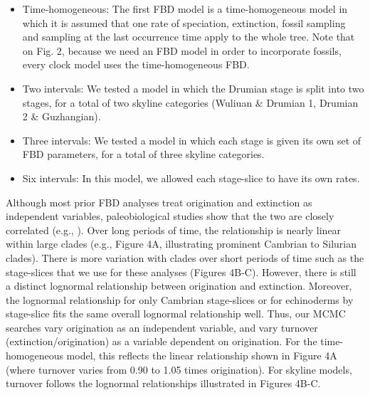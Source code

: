 \documentclass{article}
\begin{document}
\begin{itemize}
\item Time-homogeneous: The first FBD model is a time-homogeneous model in which it is assumed that one rate of speciation, extinction, fossil sampling and sampling at the last occurrence time apply to the whole tree. Note that on Fig. 2, because we need an FBD model in order to incorporate fossils, every clock model uses the time-homogeneous FBD.
\item Two intervals: We tested a model in which the Drumian stage is split into two stages, for a total of two skyline categories (Wuliuan \& Drumian 1, Drumian 2 \& Guzhangian).
\item Three intervals: We tested a model in which each stage is given its own set of FBD parameters, for a total of three skyline categories.
\item Six intervals: In this model, we allowed each stage-slice to have its own rates.
\end{itemize}
Although most prior FBD analyses treat origination and extinction as independent variables, paleobiological studies show that the two are closely correlated (e.g., \citealp{Marshall2017}). 
Over long periods of time, the relationship is nearly linear within large clades (e.g., Figure 4A, illustrating prominent Cambrian to Silurian clades). 
There is more variation with clades over short periods of time such as the stage-slices that we use for these analyses (Figures 4B-C). 
However, there is still a distinct lognormal relationship between origination and extinction. Moreover, the lognormal relationship for only Cambrian stage-slices or for echinoderms by stage-slice fits the same overall lognormal relationship well.  
Thus, our MCMC searches vary origination as an independent variable, and vary turnover (extinction/origination) as a variable dependent on origination. For the time-homogeneous model, this reflects the linear relationship shown in Figure 4A (where turnover varies from 0.90 to 1.05 times origination).
For skyline models, turnover follows the lognormal relationships illustrated in Figures 4B-C.
\end{document}
